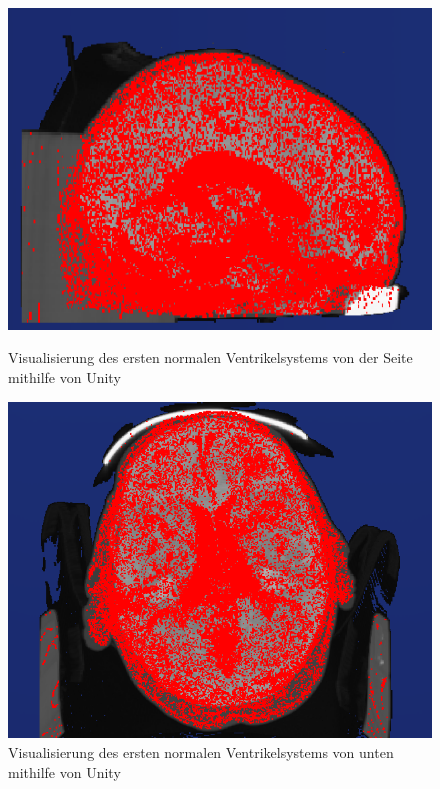 \begin{figure}[h]
\begin{minipage}[b]{.5\textwidth}
  \centering
  \includegraphics[width=.9\linewidth, height=.9\linewidth]{Logos/Normal1_Unity/Seite.PNG}
  \caption{Visualisierung des ersten normalen Ventrikelsystems von der Seite mithilfe von Unity}
  \label{fig:unity_s}
\end{minipage}%
\begin{minipage}[b]{.5\textwidth}
  \centering
  \includegraphics[width=.9\linewidth, height=.9\linewidth]{Logos/Normal1_Unity/Unten3.PNG}
  \caption{Visualisierung des ersten normalen Ventrikelsystems von unten mithilfe von Unity}
  \label{fig:unity_u}
\end{minipage}
\end{figure}


